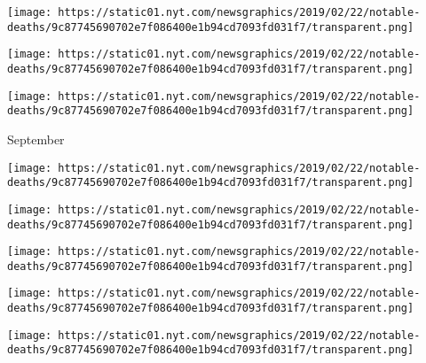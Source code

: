 \href{https://www.nytimes.com/2019/10/04/arts/music/paul-badura-skoda-dead.html}{}

\texttt{[image: https://static01.nyt.com/newsgraphics/2019/02/22/notable-deaths/9c87745690702e7f086400e1b94cd7093fd031f7/transparent.png]}

\href{https://www.nytimes.com/2019/10/03/arts/music/kim-shattuck-muffs-dead.html}{}

\texttt{[image: https://static01.nyt.com/newsgraphics/2019/02/22/notable-deaths/9c87745690702e7f086400e1b94cd7093fd031f7/transparent.png]}

\href{https://www.nytimes.com/2019/10/01/arts/design/mary-abbott-dead.html}{}

\texttt{[image: https://static01.nyt.com/newsgraphics/2019/02/22/notable-deaths/9c87745690702e7f086400e1b94cd7093fd031f7/transparent.png]}

September

\href{https://www.nytimes.com/2019/09/30/obituaries/jessye-norman-dead.html}{}

\texttt{[image: https://static01.nyt.com/newsgraphics/2019/02/22/notable-deaths/9c87745690702e7f086400e1b94cd7093fd031f7/transparent.png]}

\href{https://www.nytimes.com/2019/09/30/arts/huguette-caland-dead.html}{}

\texttt{[image: https://static01.nyt.com/newsgraphics/2019/02/22/notable-deaths/9c87745690702e7f086400e1b94cd7093fd031f7/transparent.png]}

\href{https://www.nytimes.com/2019/09/30/world/asia/shuping-wang-dead.html}{}

\texttt{[image: https://static01.nyt.com/newsgraphics/2019/02/22/notable-deaths/9c87745690702e7f086400e1b94cd7093fd031f7/transparent.png]}

\href{https://www.nytimes.com/2019/09/27/us/joseph-wilson-who-challenged-iraq-war-narrative-dies-at-69.html}{}

\texttt{[image: https://static01.nyt.com/newsgraphics/2019/02/22/notable-deaths/9c87745690702e7f086400e1b94cd7093fd031f7/transparent.png]}

\href{https://www.nytimes.com/2019/09/26/obituaries/jacques-chirac-dead.html}{}

\texttt{[image: https://static01.nyt.com/newsgraphics/2019/02/22/notable-deaths/9c87745690702e7f086400e1b94cd7093fd031f7/transparent.png]}

\href{https://www.nytimes.com/2019/09/26/us/plato-cacheris-dead.html}{}

